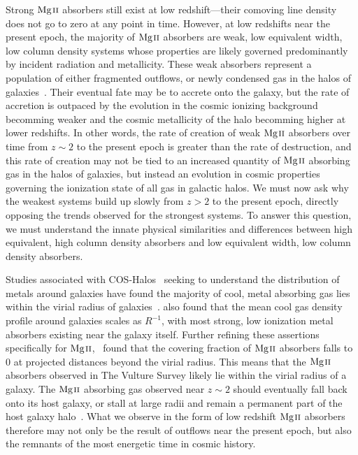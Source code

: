 \documentclass[iop,apj,numberedappendix,appendixfloats,twocolappendix]{emulateapj}
\begin{document}
Strong ${\hbox{{\rm Mg}\kern 0.1em{\sc ii}}}$ absorbers still exist at low redshift---their comoving line density does not go to zero at any point in time. However, at low redshifts near the present epoch, the majority of ${\hbox{{\rm Mg}\kern 0.1em{\sc ii}}}$ absorbers are weak, low equivalent width, low column density systems whose properties are likely governed predominantly by incident radiation and metallicity. These weak absorbers represent a population of either fragmented outflows, or newly condensed gas in the halos of galaxies~\citep{Maller2004}. Their eventual fate may be to accrete onto the galaxy, but the rate of accretion is outpaced by the evolution in the cosmic ionizing background becomming weaker and the cosmic metallicity of the halo becomming higher at lower redshifts. In other words, the rate of creation of weak ${\hbox{{\rm Mg}\kern 0.1em{\sc ii}}}$ absorbers over time from $z \sim 2$ to the present epoch is greater than the rate of destruction, and this rate of creation may not be tied to an increased quantity of ${\hbox{{\rm Mg}\kern 0.1em{\sc ii}}}$ absorbing gas in the halos of galaxies, but instead an evolution in cosmic properties governing the ionization state of all gas in galactic halos. We must now ask why the weakest systems build up slowly from $z > 2$ to the present epoch, directly opposing the trends observed for the strongest systems. To answer this question, we must understand the innate physical similarities and differences between high equivalent, high column density absorbers and low equivalent width, low column density absorbers.

Studies associated with COS-Halos~\citep{Tumlinson2011} seeking to understand the distribution of metals around galaxies have found the majority of cool, metal absorbing gas lies within the virial radius of galaxies~\citep{Peeples2014}. \cite{Stern2016} also found that the mean cool gas density profile around galaxies scales as $R^{-1}$, with most strong, low ionization metal absorbers existing near the galaxy itself. Further refining these assertions specifically for ${\hbox{{\rm Mg}\kern 0.1em{\sc ii}}}$,~\cite{Churchill2013letter} found that the covering fraction of ${\hbox{{\rm Mg}\kern 0.1em{\sc ii}}}$ absorbers falls to $0$ at projected distances beyond the virial radius. This means that the ${\hbox{{\rm Mg}\kern 0.1em{\sc ii}}}$ absorbers observed in The Vulture Survey likely lie within the virial radius of a galaxy. The ${\hbox{{\rm Mg}\kern 0.1em{\sc ii}}}$ absorbing gas observed near $z \sim 2$ should eventually fall back onto its host galaxy, or stall at large radii and remain a permanent part of the host galaxy halo~\citep{Oppenheimer2010,Ford2014}. What we observe in the form of low redshift ${\hbox{{\rm Mg}\kern 0.1em{\sc ii}}}$ absorbers therefore may not only be the result of outflows near the present epoch, but also the remnants of the most energetic time in cosmic history. 
\end{document}
